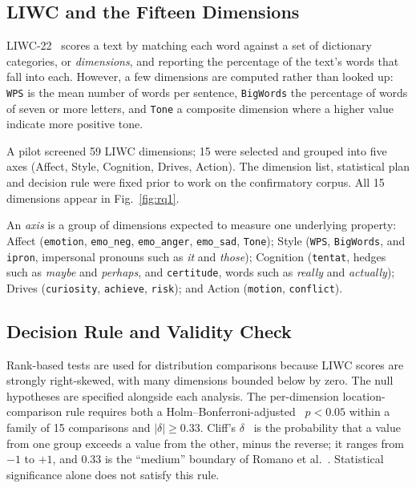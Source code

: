 \documentclass[conference]{IEEEtran}
\begin{document}
\subsection{LIWC and the Fifteen Dimensions}

LIWC-22~\cite{boyd2022} scores a text by matching each word against a set of dictionary categories, or \emph{dimensions}, and reporting the percentage of the text's words that fall into each. However, a few dimensions are computed rather than looked up: \texttt{WPS} is the mean number of words per sentence, \texttt{BigWords} the percentage of words of seven or more letters, and \texttt{Tone} a composite dimension where a higher value indicate more positive tone.

A pilot screened 59 LIWC dimensions; 15 were selected and grouped into five axes (Affect, Style, Cognition, Drives, Action). The dimension list, statistical plan and decision rule were fixed prior to work on the confirmatory corpus. All 15 dimensions appear in Fig.~\ref{fig:rq1}.

An \emph{axis} is a group of dimensions expected to measure one underlying property: Affect (\texttt{emotion}, \texttt{emo\_neg}, \texttt{emo\_anger}, \texttt{emo\_sad}, \texttt{Tone}); Style (\texttt{WPS}, \texttt{BigWords}, and \texttt{ipron}, impersonal pronouns such as \emph{it} and \emph{those}); Cognition (\texttt{tentat}, hedges such as \emph{maybe} and \emph{perhaps}, and \texttt{certitude}, words such as \emph{really} and \emph{actually}); Drives (\texttt{curiosity}, \texttt{achieve}, \texttt{risk}); and Action (\texttt{motion}, \texttt{conflict}).

\subsection{Decision Rule and Validity Check}
\label{sec:rule}

Rank-based tests are used for distribution comparisons because LIWC scores are strongly right-skewed, with many dimensions bounded below by zero. The null hypotheses are specified alongside each analysis. The per-dimension location-comparison rule requires both a Holm--Bonferroni-adjusted~\cite{holm1979} $p < 0.05$ within a family of 15 comparisons and $|\delta| \ge 0.33$. Cliff's $\delta$~\cite{cliff1993} is the probability that a value from one group exceeds a value from the other, minus the reverse; it ranges from $-1$ to $+1$, and $0.33$ is the ``medium'' boundary of Romano et al.~\cite{romano2006}. Statistical significance alone does not satisfy this rule.
\end{document}
